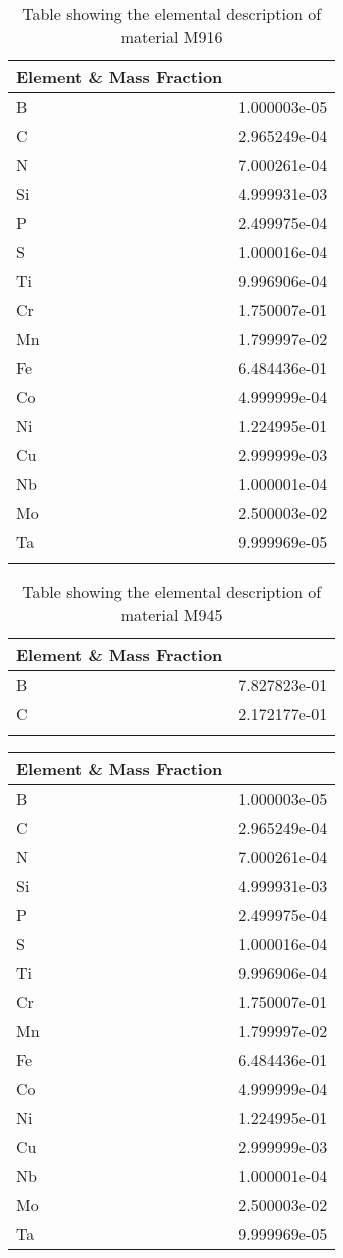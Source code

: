 \begin{centering}
\begin{longtable}[ht!]
\caption{Table showing the elemental description of material M915}
\label{table:material_UppExShield}
\end{longtable}
\clearpage

\begin{longtable}[ht!]
{ p{} | p{} }
\hline
Element \& Mass Fraction\\
\hline
B &  1.000003e-05\\
C &  2.965249e-04\\
N &  7.000261e-04\\
Si &  4.999931e-03\\
P &  2.499975e-04\\
S &  1.000016e-04\\
Ti &  9.996906e-04\\
Cr &  1.750007e-01\\
Mn &  1.799997e-02\\
Fe &  6.484436e-01\\
Co &  4.999999e-04\\
Ni &  1.224995e-01\\
Cu &  2.999999e-03\\
Nb &  1.000001e-04\\
Mo &  2.500003e-02\\
Ta &  9.999969e-05\\

\caption{Table showing the elemental description of material M916}
\label{table:material_Cryopump}
\end{longtable}
\clearpage

\begin{longtable}[ht!]
{ p{} | p{} }
\hline
Element \& Mass Fraction\\
\hline
B &  7.827823e-01\\
C &  2.172177e-01\\
\caption{Table showing the elemental description of material M945}
\label{table:material_EPPCN}
\end{longtable}
\clearpage

\begin{longtable}[ht!]
{ p{} | p{} }
\hline
Element \& Mass Fraction\\
\hline
B &  1.000003e-05\\
C &  2.965249e-04\\
N &  7.000261e-04\\
Si &  4.999931e-03\\
P &  2.499975e-04\\
S &  1.000016e-04\\
Ti &  9.996906e-04\\
Cr &  1.750007e-01\\
Mn &  1.799997e-02\\
Fe &  6.484436e-01\\
Co &  4.999999e-04\\
Ni &  1.224995e-01\\
Cu &  2.999999e-03\\
Nb &  1.000001e-04\\
Mo &  2.500003e-02\\
Ta &  9.999969e-05\\


\end{longtable}
\end{centering}
